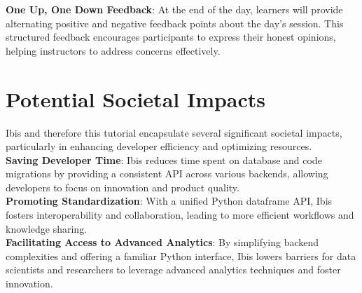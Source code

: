 \documentclass[sigconf]{acmart}
\begin{document}
\textbf{One Up, One Down Feedback}: At the end of the day, learners will provide
alternating positive and negative feedback points about the day's session. This 
structured feedback encourages participants to express their honest opinions, 
helping instructors to address concerns effectively.


\section{Potential Societal Impacts}

Ibis and therefore this tutorial encapsulate several significant societal impacts, 
particularly in enhancing developer efficiency and optimizing resources.\\

\textbf{Saving Developer Time}: Ibis reduces time spent on database and code migrations 
by providing a consistent API across various backends, allowing developers to 
focus on innovation and product quality. \\

\textbf{Promoting Standardization}: With a unified Python dataframe API, Ibis fosters 
interoperability and collaboration, leading to more efficient workflows and knowledge
sharing. \\

\textbf{Facilitating Access to Advanced Analytics}: By simplifying backend complexities
and offering a familiar Python interface, Ibis lowers barriers for data scientists 
and researchers to leverage advanced analytics techniques and foster innovation. \\




\nocite{*} %
\end{document}
